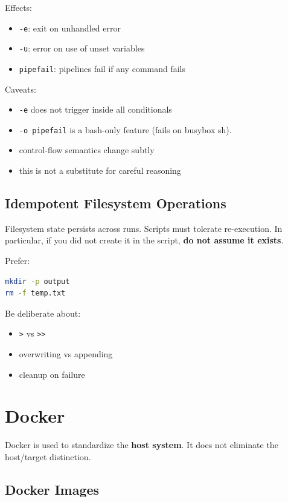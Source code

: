 \documentclass{../juni}
\begin{document}
Effects:
\begin{itemize}
  \item \texttt{-e}: exit on unhandled error
  \item \texttt{-u}: error on use of unset variables
  \item \texttt{pipefail}: pipelines fail if any command fails
\end{itemize}

Caveats:
\begin{itemize}
  \item \texttt{-e} does not trigger inside all conditionals
  \item \texttt{-o pipefail} is a bash-only feature (fails on busybox sh).
  \item control-flow semantics change subtly
  \item this is not a substitute for careful reasoning
\end{itemize}

\subsection{Idempotent Filesystem Operations}

Filesystem state persists across runs. Scripts must tolerate re-execution. In
particular, if you did not create it in the script, \textbf{do not assume it
exists}.

Prefer:

\begin{lstlisting}[language=bash]
mkdir -p output
rm -f temp.txt
\end{lstlisting}

Be deliberate about:
\begin{itemize}
  \item \texttt{>} vs \texttt{>>}
  \item overwriting vs appending
  \item cleanup on failure
\end{itemize}

\newpage
\section{Docker}

Docker is used to standardize the \textbf{host system}. It does not eliminate
the host/target distinction.

\subsection{Docker Images}
\end{document}
